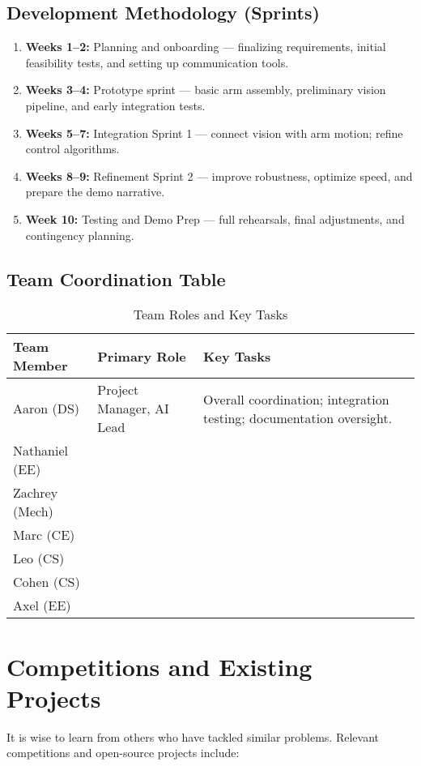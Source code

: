 \documentclass[document]{llncs}
\begin{document}
\subsection{Development Methodology (Sprints)}
\begin{enumerate}
  \item \textbf{Weeks 1--2:} Planning and onboarding --- finalizing requirements, initial feasibility tests, and setting up communication tools.
  \item \textbf{Weeks 3--4:} Prototype sprint --- basic arm assembly, preliminary vision pipeline, and early integration tests.
  \item \textbf{Weeks 5--7:} Integration Sprint 1 --- connect vision with arm motion; refine control algorithms.
  \item \textbf{Weeks 8--9:} Refinement Sprint 2 --- improve robustness, optimize speed, and prepare the demo narrative.
  \item \textbf{Week 10:} Testing and Demo Prep --- full rehearsals, final adjustments, and contingency planning.
\end{enumerate}

\subsection{Team Coordination Table}
\begin{table}[H]
\hspace*{-0.5cm}
\caption{Team Roles and Key Tasks}
\label{tab:team_roles}
\begin{tabular}{|l|p{5cm}|p{5cm}|}
\hline
\textbf{Team Member} & \textbf{Primary Role} & \textbf{Key Tasks} \\
\hline
Aaron (DS) & Project Manager, AI Lead & Overall coordination; integration testing; documentation oversight. \\
\hline
Nathaniel (EE) &  & \\
\hline
Zachrey (Mech) &  & \\
\hline
Marc (CE) &  & \\
\hline
Leo (CS) &  & \\
\hline
Cohen (CS) &  & \\
\hline
Axel (EE) &  & \\
\hline
\end{tabular}
\end{table}

\section{Competitions and Existing Projects}
It is wise to learn from others who have tackled similar problems. Relevant competitions and open-source projects include:
\end{document}
